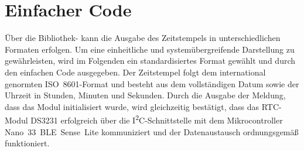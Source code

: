 %
%
%
%
%
%
%


\medskip
\noindent

\newpage


\section{Einfacher Code}
\label{sec:rtc_simple}

Über die Bibliothek- kann die Ausgabe des Zeitstempels in unterschiedlichen Formaten erfolgen. 
Um eine einheitliche und systemübergreifende Darstellung zu gewährleisten, 
wird im Folgenden ein standardisiertes Format gewählt und durch den einfachen Code ausgegeben. 
Der Zeitstempel folgt dem international genormten ISO~8601-Format \cite{ISO8601:2019} 
und besteht aus dem vollständigen Datum sowie der Uhrzeit in Stunden, Minuten und Sekunden. 
Durch die Ausgabe der Meldung, dass das Modul initialisiert wurde, 
wird gleichzeitig bestätigt, dass das RTC-Modul DS3231 erfolgreich über die I\textsuperscript{2}C-Schnittstelle 
mit dem Mikrocontroller Nano~33~BLE~Sense~Lite kommuniziert und der Datenaustausch ordnungsgemäß funktioniert. 

